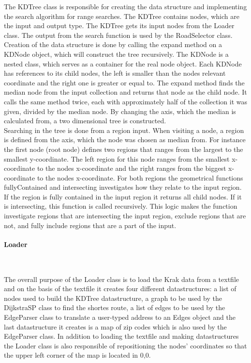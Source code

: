 \documentclass[a4paper,10pt,titlepage]{article}
\begin{document}
				The KDTree class is responsible for creating the data structure and implementing the search algorithm for range searches. The KDTree contains nodes, which are the input and output type. The KDTree gets its input nodes from the Loader class. The output from the search function is used by the RoadSelector class. 
\\
Creation of the data structure is done by calling the expand method on a KDNode object, which will construct the tree recursively. The KDNode is a nested class, which serves as a container for the real node object. Each KDNode has references to its child nodes, the left is smaller than the nodes relevant coordinate and the right one is greater or equal to. The expand method finds the median node from the input collection and returns that node as the child node. It calls the same method twice, each with approximately half of the collection it was given, divided by the median node. By changing the axis, which the median is calculated from, a two dimensional tree is constructed.
\\ Searching in the tree is done from a region input. When visiting a node, a region is defined from the axis, which the node was chosen as median from. For instance the first node (root node) defines two regions that ranges from the largest to the smallest y-coordinate. The left region for this node ranges from the smallest x-coordinate to the nodes x-coordinate and the right ranges from the biggest x-coordinate to the nodes x-coordinate. For both regions the geometrical functions fullyContained and intersecting investigates how they relate to the input region. If the region is fully contained in the input region it returns all child nodes. If it is intersecting, this function is called recursively. This logic makes the function investigate regions that are intersecting the input region, exclude regions that are not, and fully include regions that are a part of the input.

				
				\paragraph{Loader}\mbox{}\
				
The overall purpose of the Loader class is to load the Krak data from a textfile and on the basis of the textfile it creates four different datastructures: a list of nodes used to build the KDTree datastructure, a graph to be used by the DijkstraSP class to find the shortes route, a list of edges to be used by the EdgeParser class to translate a user-typed address to an Edges object and the last datastructure it creates is a map of zip codes which is also used by the EdgeParser class. In addition to loading the textfile and making datastructures the Loader class is also responsible of repositioning the nodes' coordinates so that the upper left corner of the map is located in 0,0.
\end{document}
